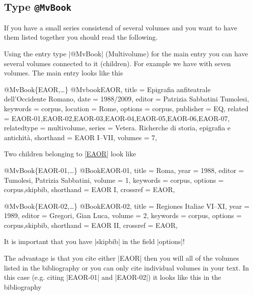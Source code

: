 \documentclass[a4paper,
10pt,
greek,
french,
spanish,
italian,
ngerman,
english,
]{ltxdoc}
\begin{document}


\subsection{Type \texttt{@MvBook}}\label{mvbook}
 If you have a small series consistend of several volumes and you want to have them listed together you should read the following.

Using the entry type |@MvBook| (Multivolume) for the main entry you can have several volumes connected to it (children).
For example we have  with seven volumes. 
The main entry looks like this

\begin{bibexample}[label=EAOR]{{@}MvBook\{EAOR,…\}}
@Mvbook{EAOR,
  title       = {Epigrafia anfiteatrale dell'Occidente Romano},
  date        = {1988/2009},
  editor      = {Patrizia Sabbatini Tumolesi},
  keywords    = {corpus},
  location    = Rome, %
  options     = {corpus},
  publisher   = EQ, %
  related     = {EAOR-01,EAOR-02,EAOR-03,EAOR-04,EAOR-05,EAOR-06,EAOR-07},
  relatedtype = {multivolume},
  series      = {Vetera. Richerche di storia, epigrafia e antichità},
  shorthand   = {EAOR I--VII},
  volumes     = {7},
}
\end{bibexample}

Two children belonging to \cref{EAOR} look like

\begin{bibexample}[label=EAOR-01]{{@}MvBook\{EAOR-01,…\}}
@Book{EAOR-01,
  title     = {Roma},
  year      = {1988},
  editor    = {Tumolesi, Patrizia Sabbatini},
  volume    = {1},
  keywords  = {corpus},
  options   = {corpus,skipbib},
  shorthand = {EAOR I},
  crossref = {EAOR},
}
\end{bibexample}

\begin{bibexample}[label=EAOR-02]{{@}MvBook\{EAOR-02,…\}}
@Book{EAOR-02,
  title     = {Regiones Italiae VI--XI},
  year      = {1989},
  editor    = {Gregori, Gian Luca},
  volume    = {2},
  keywords  = {corpus},
  options   = {corpus,skipbib},
  shorthand = {EAOR II},
  crossref = {EAOR},
}
\end{bibexample}
It is important that you have |skipbib| in the field |options|!

The advantage is that you cite either |EAOR| then you will all of the volumes listed in the bibliography 
or you can only cite individual volumes in your text.
In this case (e.g. citing |EAOR-01| and |EAOR-02|) it looks like this in the bibliography 
\end{document}
